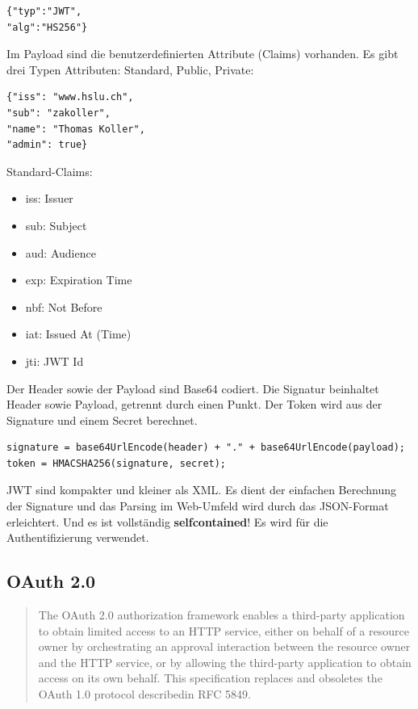 \begin{lstlisting}[caption=JWT Header]
{"typ":"JWT",
"alg":"HS256"}
\end{lstlisting}

\newpage

Im Payload sind die benutzerdefinierten Attribute (Claims) vorhanden. Es gibt drei Typen Attributen: Standard, Public, Private:

\begin{lstlisting}[caption=JWT Payload]
{"iss": "www.hslu.ch",
"sub": "zakoller",
"name": "Thomas Koller",
"admin": true}
\end{lstlisting}

Standard-Claims:
\begin{itemize}
	\item iss: Issuer
	\item sub: Subject
	\item aud: Audience
	\item exp: Expiration Time
	\item nbf: Not Before
	\item iat: Issued At (Time)
	\item jti: JWT Id
\end{itemize}

Der Header sowie der Payload sind Base64 codiert. Die Signatur beinhaltet Header sowie Payload, getrennt durch einen Punkt. Der Token wird aus der Signature und einem Secret berechnet.

\begin{lstlisting}[caption=JWT Signature]
signature = base64UrlEncode(header) + "." + base64UrlEncode(payload);
token = HMACSHA256(signature, secret);
\end{lstlisting}

JWT sind kompakter und kleiner als XML. Es dient der einfachen Berechnung der Signature und das Parsing im Web-Umfeld wird durch das JSON-Format erleichtert. Und es ist vollständig \textbf{selfcontained}! Es wird für die Authentifizierung verwendet.

\subsection{OAuth 2.0}



\begin{quote}
The OAuth 2.0 authorization framework enables a third-party
application to obtain limited access to an HTTP service, either on
behalf of a resource owner by orchestrating an approval interaction
between the resource owner and the HTTP service, or by allowing
the third-party application to obtain access on its own behalf. This
specification replaces and obsoletes the OAuth 1.0 protocol
describedin RFC 5849.
\end{quote}

